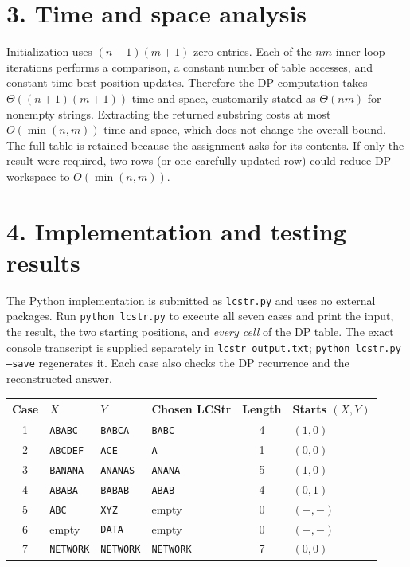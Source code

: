 \documentclass[11pt,a4paper]{article}
\newcommand{\code}[1]{\texttt{#1}}
\begin{document}
\section*{3. Time and space analysis}
Initialization uses $(n+1)(m+1)$ zero entries. Each of the $nm$ inner-loop
iterations performs a comparison, a constant number of table accesses, and
constant-time best-position updates. Therefore the DP computation takes
$\Theta((n+1)(m+1))$ time and space, customarily stated as
$\boxed{\Theta(nm)}$ for nonempty strings. Extracting the returned substring
costs at most $O(\min(n,m))$ time and space, which does not change the overall
bound. The full table is retained because the assignment asks for its contents.
If only the result were required, two rows (or one carefully updated row) could
reduce DP workspace to $O(\min(n,m))$.

\section*{4. Implementation and testing results}
The Python implementation is submitted as \code{lcstr.py} and uses no external
packages. Run \code{python lcstr.py} to execute all seven cases and print the
input, the result, the two starting positions, and \emph{every cell} of the DP
table. The exact console transcript is supplied separately in
\code{lcstr\_output.txt}; \code{python lcstr.py --save} regenerates it.
Each case also checks the DP recurrence and the reconstructed answer.

\begin{center}
\small
\begin{tabular}{@{}c l l l c l@{}}
\toprule
Case & $X$ & $Y$ & Chosen LCStr & Length & Starts $(X,Y)$\\
\midrule
1 & \code{ABABC} & \code{BABCA} & \code{BABC} & 4 & $(1,0)$\\
2 & \code{ABCDEF} & \code{ACE} & \code{A} & 1 & $(0,0)$\\
3 & \code{BANANA} & \code{ANANAS} & \code{ANANA} & 5 & $(1,0)$\\
4 & \code{ABABA} & \code{BABAB} & \code{ABAB} & 4 & $(0,1)$\\
5 & \code{ABC} & \code{XYZ} & empty & 0 & $(-,-)$\\
6 & empty & \code{DATA} & empty & 0 & $(-,-)$\\
7 & \code{NETWORK} & \code{NETWORK} & \code{NETWORK} & 7 & $(0,0)$\\
\bottomrule
\end{tabular}
\end{center}
\end{document}
